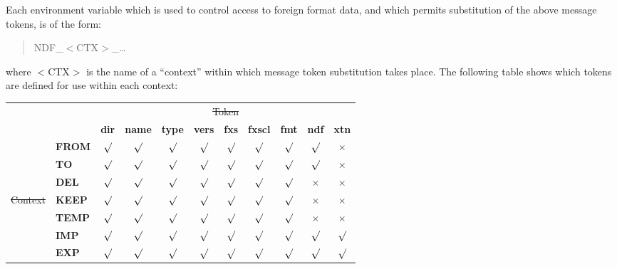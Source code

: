 Each environment variable which is used to control access to foreign
format data, and which permits substitution of the above message
tokens, is of the form:

\begin{quote}
NDF\_$<$CTX$>$\_\ldots
\end{quote}

where $<$CTX$>$ is the name of a ``context'' within which message
token substitution takes place. The following table shows which tokens
are defined for use within each context:

\newcommand{\yes}[0]{$\surd$}
\newcommand{\no}[0]{$\times$}
\begin{center}
\begin{tabular}{r|l|ccccccccc|}
\multicolumn{2}{c}{}&\multicolumn{9}{c}{\st{Token}}\\
\cline{3-11}
\multicolumn{2}{c|}{}&{\bf dir}&{\bf name}&{\bf type}&{\bf vers}
&{\bf fxs}&{\bf fxscl}&{\bf fmt}&{\bf ndf}&{\bf xtn}\\
\cline{2-11}
&{\bf FROM} & \yes & \yes & \yes & \yes & \yes & \yes & \yes & \yes & \no \\
&{\bf TO}   & \yes & \yes & \yes & \yes & \yes & \yes & \yes & \yes & \no \\
&{\bf DEL}  & \yes & \yes & \yes & \yes & \yes & \yes & \yes & \no  & \no \\
\st{Context} &{\bf KEEP} & \yes & \yes & \yes & \yes & \yes & \yes & \yes & \no  & \no \\
&{\bf TEMP} & \yes & \yes & \yes & \yes & \yes & \yes & \yes & \no & \no \\
&{\bf IMP}  & \yes & \yes & \yes & \yes & \yes & \yes & \yes & \yes & \yes \\
&{\bf EXP}  & \yes & \yes & \yes & \yes & \yes & \yes & \yes & \yes & \yes \\
\cline{2-11}
\end{tabular}
\end{center}


